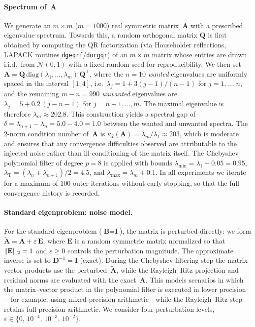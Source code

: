 \documentclass[preprint,3p,number,sort&compress]{elsarticle}
\newcommand{\bA}{\textbf{A}}
\newcommand{\bB}{\textbf{B}}
\newcommand{\bD}{\textbf{D}}
\newcommand{\bE}{\textbf{E}}
\newcommand{\bI}{\textbf{I}}
\newcommand{\bQ}{\textbf{Q}}
\newcommand{\cblue }{\color{black}}
\newcommand{\cn}{\color{black}}
\DeclarePairedDelimiter\norm{\lVert}{\rVert\,}%
\begin{document}
{\paragraph{Spectrum of~$\bA$}
We generate an $m\times m$ ($m=1000$) real symmetric matrix~$\bA$ with a prescribed eigenvalue spectrum. Towards this, a random orthogonal matrix $\bQ$ is first obtained by computing the QR factorization (via Householder reflections, LAPACK routines \texttt{dgeqrf}/\texttt{dorgqr}) of an $m\times m$ matrix whose entries are drawn i.i.d.\ from $\mathcal{N}(0,1)$ with a fixed random seed for reproducibility. We then set $\bA = \bQ\,\mathrm{diag}(\lambda_1,\dots,\lambda_m)\,\bQ^\top$, where the $n=10$ \emph{wanted} eigenvalues are uniformly spaced in the interval $[1,4]$, i.e.\ $\lambda_j = 1 + 3(j-1)/(n-1)$ for $j=1,\dots,n$, and the remaining $m-n=990$ \emph{unwanted} eigenvalues are $\lambda_j = 5 + 0.2\,(j-n-1)$ for $j=n+1,\dots,m$. The maximal eigenvalue is therefore $\lambda_m \approx 202.8$. This construction yields a spectral gap of $\delta = \lambda_{n+1} - \lambda_n = 5.0 - 4.0 = 1.0$ between the wanted and unwanted spectra. The 2-norm condition number of~$\bA$ is $\kappa_2(\bA)=\lambda_m/\lambda_1\approx 203$, which is moderate and ensures that any convergence difficulties observed are attributable to the injected noise rather than ill-conditioning of the matrix itself. The Chebyshev polynomial filter of degree $p=8$ is applied with bounds $\lambda_{\min}=\lambda_1 - 0.05=0.95$, $\lambda_{\mathrm{T}} = (\lambda_n + \lambda_{n+1})/2 = 4.5$, and $\lambda_{\max}=\lambda_m + 0.1$. In all experiments we iterate for a maximum of $100$ outer iterations without early stopping, so that the full convergence history is recorded.

\paragraph{Standard eigenproblem: noise model.}
{\cblue For the standard eigenproblem ($\bB=\bI$), the matrix is perturbed directly: we form $\tilde{\bA}=\bA+\varepsilon\,\bE$, where $\bE$ is a random symmetric matrix normalized so that $\norm{\bE}_2=1$ and $\varepsilon\geq 0$ controls the perturbation magnitude. The approximate inverse is set to $\bD^{-1}=\bI$ (exact). During the Chebyshev filtering step the matrix--vector products use the perturbed~$\tilde{\bA}$, while the Rayleigh--Ritz projection and residual norms are evaluated with the exact~$\bA$. This models scenarios in which the matrix--vector product in the polynomial filter is executed in lower precision---for example, using mixed-precision arithmetic---while the Rayleigh--Ritz step retains full-precision arithmetic. We consider four perturbation levels, $\varepsilon\in\{0,\,10^{-4},\,10^{-3},\,10^{-2}\}$.\cn}

}
\end{document}
